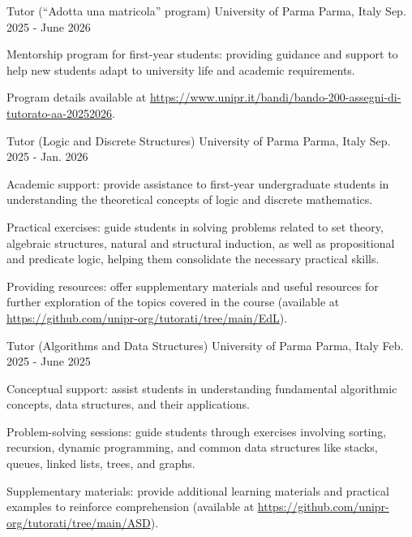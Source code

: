 
\begin{cventries}
  \cventry
  {Tutor (``Adotta una matricola'' program)} %
  {University of Parma} %
  {Parma, Italy} %
  {Sep. 2025 - June 2026} %
  {
    \begin{cvitems}
    \item Mentorship program for first-year students: providing
      guidance and support to help new students adapt to university
      life and academic requirements.
    \item Program details available at
      \url{https://www.unipr.it/bandi/bando-200-assegni-di-tutorato-aa-20252026}.
    \end{cvitems}
  }

  \cventry
  {Tutor (Logic and Discrete Structures)}
  {University of Parma}
  {Parma, Italy}
  {Sep. 2025 - Jan. 2026}
  {
    \begin{cvitems}
    \item Academic support: provide assistance to first-year
      undergraduate students in understanding the theoretical
      concepts of logic and discrete mathematics.
    \item Practical exercises: guide students in solving problems
      related to set theory, algebraic structures, natural and
      structural induction, as well as propositional and predicate
      logic, helping them consolidate the necessary practical skills.
    \item Providing resources: offer supplementary materials and
      useful resources for further exploration of the topics covered
      in the course (available at
      \url{https://github.com/unipr-org/tutorati/tree/main/EdL}).
    \end{cvitems}
  }

  \cventry
  {Tutor (Algorithms and Data Structures)} %
  {University of Parma} %
  {Parma, Italy} %
  {Feb. 2025 - June 2025} %
  {
    \begin{cvitems} %
    \item Conceptual support: assist students in understanding
      fundamental algorithmic concepts, data structures, and their applications.
    \item Problem-solving sessions: guide students through exercises
      involving sorting, recursion, dynamic programming, and common
      data structures like stacks, queues, linked lists, trees, and graphs.
    \item Supplementary materials: provide additional learning
      materials and practical examples to reinforce comprehension
      (available at \url{https://github.com/unipr-org/tutorati/tree/main/ASD}).
    \end{cvitems}
  }


\end{cventries}
